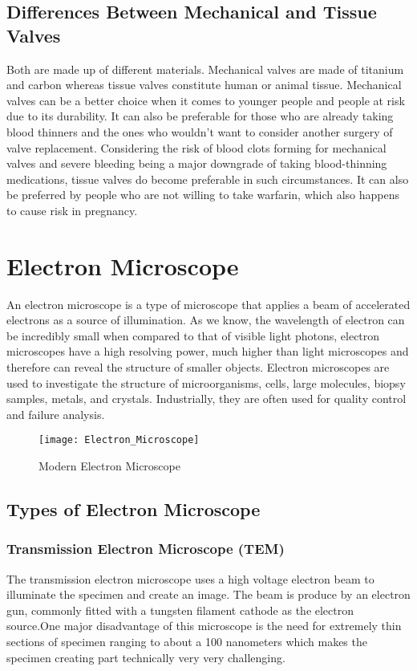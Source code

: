 \documentclass[12pt]{article}
\begin{document}
\begin{normalsize}
\subsection{Differences Between Mechanical and Tissue Valves}
Both are made up of different materials. Mechanical valves are made of titanium and carbon whereas tissue valves constitute human or animal tissue. Mechanical valves can be a better choice when it comes to younger people and people at risk due to its durability. It can also be preferable for those who are already taking blood thinners and the ones who wouldn't want to consider another surgery of valve replacement.
\linebreak
\linebreak
Considering the risk of blood clots forming for mechanical valves and severe bleeding being a major downgrade of taking blood-thinning medications, tissue valves do become preferable in such circumstances. It can also be preferred by people who are not willing to take warfarin, which also happens to cause risk in pregnancy.

\centering
\section{Electron Microscope}
An electron microscope is a type of microscope that applies a beam of accelerated electrons as a source of illumination. As we know, the wavelength of electron can be incredibly small when compared to that of visible light photons, electron microscopes have a high resolving power, much higher than light microscopes and therefore can reveal the structure of smaller objects.
Electron microscopes are used to investigate the structure of microorganisms, cells, large molecules, biopsy samples, metals, and crystals. Industrially, they are often used for quality control and failure analysis.
\begin{figure}[h]
\centering
\texttt{[image: Electron\_Microscope]}
\caption{Modern Electron Microscope}
\end{figure}

\subsection{Types of Electron Microscope}

\raggedright
\subsubsection{Transmission Electron Microscope (TEM)}
The transmission electron microscope uses a high voltage electron beam to illuminate the specimen and create an image. The beam is produce by an electron gun, commonly fitted with a tungsten filament cathode as the electron source.One major disadvantage of this microscope is the need for extremely thin sections of specimen ranging to about a 100 nanometers which makes the specimen creating part technically very very challenging.


\end{normalsize}
\end{document}

